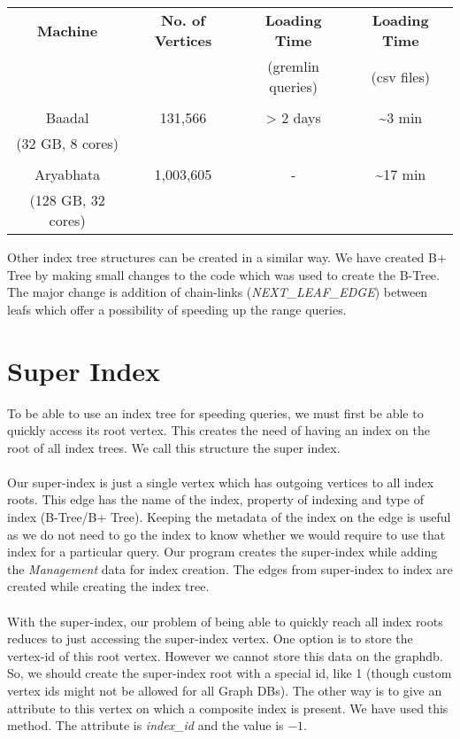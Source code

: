 \begin{center}
\begin{tabular}{|c|c|c|c|}
\hline
\textbf{Machine} & \textbf{No. of Vertices} & \textbf{Loading Time} & \textbf{Loading Time}\\
& & (gremlin queries) & (csv files)\\
\hline
& & &\\
Baadal & 131,566 & > 2 days & \textasciitilde 3 min \\
(32 GB, 8 cores) & & & \\
\hline
& & &\\
Aryabhata & 1,003,605 & - & \textasciitilde 17 min \\
(128 GB, 32 cores) & & & \\
\hline
\end{tabular}
\end{center}
$\:$\\
Other index tree structures can be created in a similar way. We have created B+ Tree by making small changes to the code which was used to create the B-Tree. The major change is addition of chain-links (\textit{NEXT\_LEAF\_EDGE}) between leafs which offer a possibility of speeding up the range queries.

\section{Super Index}
To be able to use an index tree for speeding queries, we must first be able to quickly access its root vertex. This creates the need of having an index on the root of all index trees. We call this structure the super index.
\\\\
Our super-index is just a single vertex which has outgoing vertices to all index roots. This edge has the name of the index, property of indexing and type of index (B-Tree/B+ Tree). Keeping the metadata of the index on the edge is useful as we do not need to go the index to know whether we would require to use that index for a particular query. Our program creates the super-index while adding the \textit{Management} data for index creation. The edges from super-index to index are created while creating the index tree.
\\\\
With the super-index, our problem of being able to quickly reach all index roots reduces to just accessing the super-index vertex. One option is to store the vertex-id of this root vertex. However we cannot store this data on the graphdb. So, we should create the super-index root with a special id, like 1 (though custom vertex ids might not be allowed for all Graph DBs). The other way is to give an attribute to this vertex on which a composite index is present. We have used this method. The attribute is \textit{index\_id} and the value is $-1$.